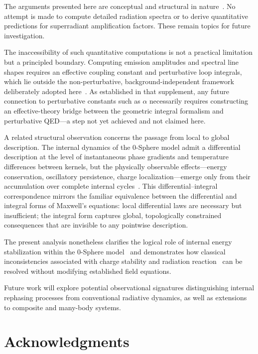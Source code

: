 \documentclass[12pt,a4paper]{article}
\begin{document}
\justifying

The arguments presented here are conceptual and structural in nature~\cite{hanamura18603340}. No attempt is made to compute detailed radiation spectra or to derive quantitative predictions for superradiant amplification factors. These remain topics for future investigation.

The inaccessibility of such quantitative computations is not a practical limitation but a principled boundary. Computing emission amplitudes and spectral line shapes requires an effective coupling constant and perturbative loop integrals, which lie outside the non-perturbative, background-independent framework deliberately adopted here~\cite{hanamura18603340}. As established in that supplement, any future connection to perturbative constants such as $\alpha$ necessarily requires constructing an effective-theory bridge between the geometric integral formalism and perturbative QED---a step not yet achieved and not claimed here.

A related structural observation concerns the passage from local to global description. The internal dynamics of the 0-Sphere model admit a differential description at the level of instantaneous phase gradients and temperature differences between kernels, but the physically observable effects---energy conservation, oscillatory persistence, charge localization---emerge only from their accumulation over complete internal cycles~\cite{hanamura18356895}. This differential--integral correspondence mirrors the familiar equivalence between the differential and integral forms of Maxwell's equations: local differential laws are necessary but insufficient; the integral form captures global, topologically constrained consequences that are invisible to any pointwise description.

The present analysis nonetheless clarifies the logical role of internal energy stabilization within the 0-Sphere model~\cite{hanamura16759284} and demonstrates how classical inconsistencies associated with charge stability and radiation reaction~\cite{dirac1938,jackson1999} can be resolved without modifying established field equations.

Future work will explore potential observational signatures distinguishing internal rephasing processes from conventional radiative dynamics, as well as extensions to composite and many-body systems.

\section*{Acknowledgments}
\end{document}
